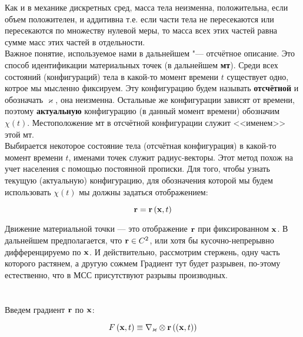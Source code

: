 \documentclass[a4papper, 14pt]{book}
\renewcommand{\kappa}{\ensuremath{\varkappa}}
\newcommand{\diad}{\ensuremath\otimes}
\newcommand{\lf}{\ensuremath \left(}
\newcommand{\ri}{\ensuremath \right)}
\newcommand{\mt}{{\textbf{мт}}}
\newcommand{\mf}[1]{\ensuremath\mathbf{#1}}
\theoremstyle{plain} %
\theoremstyle{definition} %
\theoremstyle{remark} %
\begin{document}
	Как и в механике дискретных сред, масса тела неизменна, положительна, если объем положителен, и аддитивна т.е. если части тела не пересекаются или пересекаются по множеству нулевой меры, то масса всех этих частей равна сумме масс этих частей в отдельности. \\
	
	Важное понятие, используемое нами в дальнейшем "--- отсчётное описание. Это способ идентификации материальных точек (в дальнейшем \mt).
	Среди всех состояний (конфигураций) тела в какой-то момент времени $t$ существует одно, котрое мы мысленно фиксируем. Эту конфигурацию будем называть \textbf{отсчётной} и обозначать $\kappa$, она неизменна. Остальные же конфигурации зависят от времени, поэтому {\textbf{актуальную}} конфигурацию (в данный момент времени) обозначим  $\chi\left(t\right)$. Местоположение мт в отсчётной конфигурации служит <<именем>> этой мт. \\
	
	Выбирается некоторое состояние тела  (отсчётная конфигурация) в какой-то момент времени $t$, именами точек служит радиус-векторы. Этот метод похож на учет населения с помощью постоянной прописки. Для того, чтобы узнать текущую (актуальную) конфигурацию, для обозначения которой мы будем использовать $\chi(t)$ мы должны задаться отображением:
	
	\begin{equation}\label{eq:transform}
	\mf{r} = \mf{r}\lf\mf{x},t\ri
	\end{equation}
	
	Движение материальной точки --- это отображение $\mf{r}$ при фиксированном $\mf{x}$. В дальнейшем предполагается, что $\mf{r}\in C^2$, или хотя бы кусочно-непрерывно дифференцируемо по $\mf{x}$. И действительно, рассмотрим стержень, одну часть которого растянем, а другую сожмем Градиент тут будет разрывен, по-этому естественно, что в МСС присутствуют разрывы производных. 
	
	\setcounter{chapter}{1}
	\setcounter{section}{0}
	\def\thesection{Лекция \arabic{section}}
	\section{}
	
	Введем градиент $\mf{r}$ по $\mf{x}$:
	
	\begin{equation}\label{eq:grad}
	F \lf \mf{x}, t\ri \equiv \nabla_{\kappa}\diad\mf{r}\lf(\mf{x}, t\ri)
	\end{equation}
	
\end{document}
